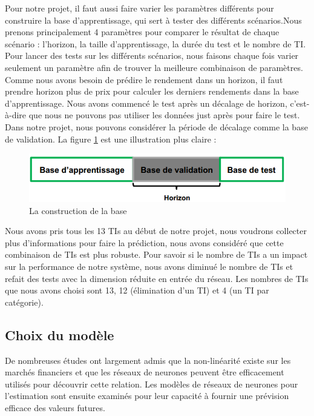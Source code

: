 Pour notre projet, il faut aussi faire varier les paramètres différents pour construire la base d'apprentissage, qui sert à tester des différents scénarios.Nous prenons principalement 4 paramètres pour comparer le résultat de chaque scénario : l'horizon, la taille d'apprentissage, la durée du test et le nombre de TI. Pour lancer des tests sur les différents scénarios, nous faisons chaque fois varier seulement un paramètre afin de trouver la meilleure combinaison de paramètres.\\

Comme nous avons besoin de prédire le rendement dans un horizon, il faut prendre horizon plus de prix pour calculer les derniers rendements dans la base d'apprentissage. Nous avons commencé le test après un décalage de horizon, c'est-à-dire que nous ne pouvons pas utiliser les données just après pour faire le test. Dans notre projet, nous pouvons considérer la période de décalage comme la base de validation. La figure \ref{fig:BA} est une illustration plus claire : \\

\begin{figure}[H]
	\centering
	\includegraphics[width=.9\linewidth, scale=0.2]
	{plot/BA.png}
	\caption{La construction de la base}
	\label{fig:BA}
\end{figure}

Nous avons pris tous les 13 TIs au début de notre projet, nous voudrons collecter plus d’informations pour faire la prédiction, nous avons considéré que cette combinaison de TIs est plus robuste. Pour savoir si le nombre de TIs a un impact sur la performance de notre système, nous avons diminué le nombre de TIs et refait des tests avec la dimension réduite en entrée du réseau. Les nombres de TIs que nous avons choisi sont 13, 12 (élimination d'un TI) et 4 (un TI par catégorie).

\subsection{Choix du modèle}

De nombreuses études ont largement admis que la non-linéarité existe sur les marchés financiers et que les réseaux de neurones peuvent être efficacement utilisés pour découvrir cette relation. Les modèles de réseaux de neurones pour l'estimation sont ensuite examinés pour leur capacité à fournir une prévision efficace des valeurs futures.\\

